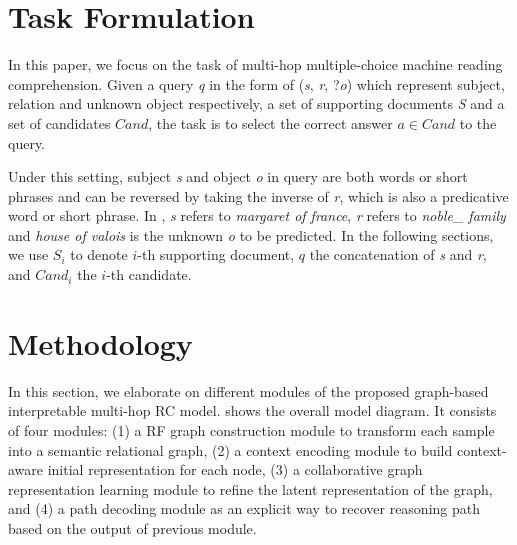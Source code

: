 \section{Task Formulation}
In this paper, we focus on the task of multi-hop multiple-choice machine reading comprehension. Given a query \textit{q} in the form of (\textit{s}, \textit{r}, ?\textit{o}) which represent subject, relation and unknown object respectively, a set of supporting documents \textit{S} and a set of candidates $Cand$, the task is to select the correct answer $\textit{a}\in Cand$ to the query.

Under this setting, subject \textit{s} and object \textit{o} in query are both words or short phrases and can be reversed by taking the inverse of \textit{r}, which is also a predicative word or short phrase. In , \textit{s} refers to  \textit{margaret of france}, \textit{r} refers to \textit{noble\_ family} and \textit{house of valois} is the unknown \textit{o} to be predicted. In the following sections, we use $S_i$ to denote $i$-th supporting document, $q$ the concatenation of \textit{s} and \textit{r}, and $Cand_i$ the $i$-th candidate.

\section{Methodology}
In this section, we elaborate on different modules of the proposed graph-based interpretable multi-hop RC model.  shows the overall model diagram. It consists of four modules: (1) a RF graph construction module to transform each sample into a semantic relational graph, (2) a context encoding module to build context-aware initial representation for each node, (3) a collaborative graph representation learning module to refine the latent representation of the graph, and (4) a path decoding module as an explicit way to recover reasoning path based on the output of previous module. 
